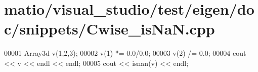 \hypertarget{matio_2visual__studio_2test_2eigen_2doc_2snippets_2_cwise__is_na_n_8cpp_source}{}\section{matio/visual\+\_\+studio/test/eigen/doc/snippets/\+Cwise\+\_\+is\+NaN.cpp}
\label{matio_2visual__studio_2test_2eigen_2doc_2snippets_2_cwise__is_na_n_8cpp_source}

\begin{DoxyCode}
00001 Array3d v(1,2,3);
00002 v(1) *= 0.0/0.0;
00003 v(2) /= 0.0;
00004 cout << v << endl << endl;
00005 cout << isnan(v) << endl;
\end{DoxyCode}
